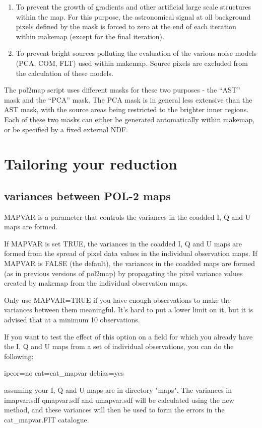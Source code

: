 \begin{enumerate}\itemsep-0.2em
\item To prevent the growth of gradients and other artificial large scale structures within the
map.  For this purpose, the astronomical signal at all background pixels defined by the
mask is forced to zero at the end of each iteration within makemap (except for the final iteration).
\item To prevent bright sources polluting the evaluation of the various noise models (PCA, COM, FLT) used within
makemap. Source pixels are excluded from the calculation of these models.
\end{enumerate}


The pol2map script uses different masks for these two purposes - the “AST” mask and the “PCA” mask. 
The PCA mask is in general less extensive than the AST mask, with the source areas being restricted to the brighter inner regions.
Each of these two masks can either be generated automatically within makemap, or be specified by
a fixed external NDF. 



\section{Tailoring your reduction}

\subsection*{variances between POL-2 maps}

MAPVAR is a parameter that controls the variances in the coadded 
I, Q and U maps are formed.

If  MAPVAR is set TRUE, the variances in the coadded I, Q and U maps
are formed from the spread of pixel data values in the individual
observation maps. If MAPVAR is FALSE (the default), the variances in
the coadded maps are formed (as in previous versions of pol2map) by
propagating the pixel variance values created by makemap from the
individual observation maps.

Only use MAPVAR=TRUE if you have enough observations to
make the variances between them meaningful. It's hard to put a lower
limit on it, but it is advised that at a minimum 10 observations.


If you want to test the effect of this option on a field for which you
already have the I, Q and U maps from a set of individual
observations, you can do the following:

\begin{terminalv}
                   ipcor=no cat=cat_mapvar debias=yes
\end{terminalv}

assuming your I, Q and U maps are in directory "maps". The variances
in imapvar.sdf qmapvar.sdf and umapvar.sdf will be calculated using
the new method, and these variances will then be used to form the
errors in the cat_mapvar.FIT catalogue.



